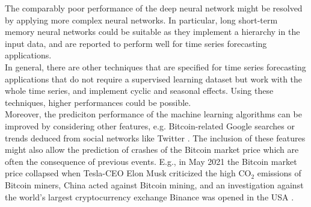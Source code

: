 The comparably poor performance of the deep neural network might be resolved by applying more complex neural networks. In particular, long short-term memory neural networks could be suitable as they implement a hierarchy in the input data, and are reported to perform well for time series forecasting applications.\\

In general, there are other techniques that are specified for time series forecasting applications that do not require a supervised learning dataset but work with the whole time series, and implement cyclic and seasonal effects. Using these techniques, higher performances could be possible.\\

Moreover, the prediciton performance of the machine learning algorithms can be improved by considering other features, e.g. Bitcoin-related Google searches or trends deduced from social networks like Twitter \cite{SocialMedia2015}\cite{Twitter2019}. The inclusion of these features might also allow the prediction of crashes of the Bitcoin market price which are often the consequence of previous events. E.g., in May 2021 the Bitcoin market price collapsed when Tesla-CEO Elon Musk criticized the high CO$_2$ emissions of Bitcoin miners, China acted against Bitcoin mining, and an investigation against the world's largest cryptocurrency exchange Binance was opened in the USA \cite{Musk2021}\cite{China2021}\cite{Binance2021}.